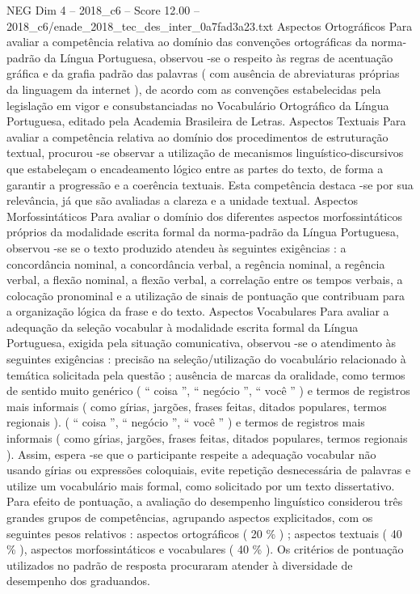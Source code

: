 \begin{textsample}{NEG Dim 4 – 2018\_c6 – Score 12.00 – 2018\_c6/enade\_2018\_tec\_des\_inter\_0a7fad3a23.txt}
Aspectos Ortográficos Para avaliar a competência relativa ao domínio das convenções ortográficas da norma-padrão da Língua Portuguesa, observou -se o respeito às regras de acentuação gráfica e da grafia padrão das palavras ( com ausência de abreviaturas próprias da linguagem da internet ), de acordo com as convenções estabelecidas pela legislação em vigor e consubstanciadas no Vocabulário Ortográfico da Língua Portuguesa, editado pela Academia Brasileira de Letras.
Aspectos Textuais Para avaliar a competência relativa ao domínio dos procedimentos de estruturação textual, procurou -se observar a utilização de mecanismos linguístico-discursivos que estabeleçam o encadeamento lógico entre as partes do texto, de forma a garantir a progressão e a coerência textuais.
Esta competência destaca -se por sua relevância, já que são avaliadas a clareza e a unidade textual.
Aspectos Morfossintáticos Para avaliar o domínio dos diferentes aspectos morfossintáticos próprios da modalidade escrita formal da norma-padrão da Língua Portuguesa, observou -se se o texto produzido atendeu às seguintes exigências : a concordância nominal, a concordância verbal, a regência nominal, a regência verbal, a flexão nominal, a flexão verbal, a correlação entre os tempos verbais, a colocação pronominal e a utilização de sinais de pontuação que contribuam para a organização lógica da frase e do texto.
Aspectos Vocabulares Para avaliar a adequação da seleção vocabular à modalidade escrita formal da Língua Portuguesa, exigida pela situação comunicativa, observou -se o atendimento às seguintes exigências : precisão na seleção/utilização do vocabulário relacionado à temática solicitada pela questão ; ausência de marcas da oralidade, como termos de sentido muito genérico ( “ coisa ”, “ negócio ”, “ você ” ) e termos de registros mais informais ( como gírias, jargões, frases feitas, ditados populares, termos regionais ). ( “ coisa ”, “ negócio ”, “ você ” ) e termos de registros mais informais ( como gírias, jargões, frases feitas, ditados populares, termos regionais ).
Assim, espera -se que o participante respeite a adequação vocabular não usando gírias ou expressões coloquiais, evite repetição desnecessária de palavras e utilize um vocabulário mais formal, como solicitado por um texto dissertativo.
Para efeito de pontuação, a avaliação do desempenho linguístico considerou três grandes grupos de competências, agrupando aspectos explicitados, com os seguintes pesos relativos : aspectos ortográficos ( 20 \% ) ; aspectos textuais ( 40 \% ), aspectos morfossintáticos e vocabulares ( 40 \% ).
Os critérios de pontuação utilizados no padrão de resposta procuraram atender à diversidade de desempenho dos graduandos.

\end{textsample}
